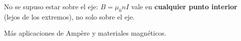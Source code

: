 \documentclass[12pt,a4paper]{article}
\begin{document}
\begin{keybox}
  No se supuso estar sobre el eje: $B = \mu_0 n I$ vale en \textbf{cualquier
  punto interior} (lejos de los extremos), no solo sobre el eje.
\end{keybox}



\begin{notebox}
  Más aplicaciones de Ampère y materiales magnéticos.
\end{notebox}
\end{document}
